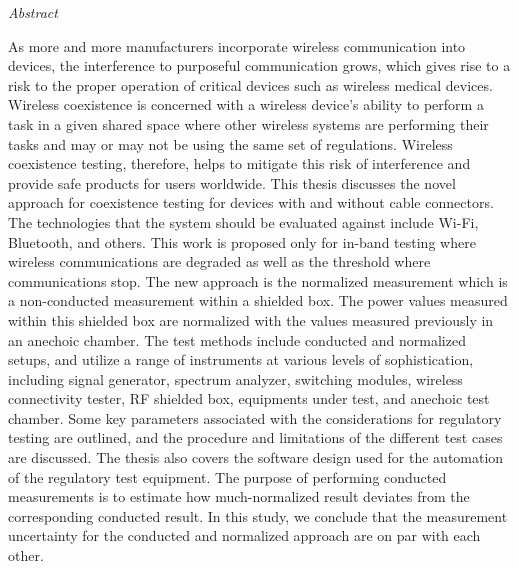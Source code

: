 

\newpage
\thispagestyle{empty}
\begin{center}
\Huge\emph{Abstract}
\end{center}
\medskip
\noindent As more and more manufacturers incorporate wireless communication into devices, the interference to purposeful communication grows, which gives rise to a risk to the proper operation of critical devices such as wireless medical devices. Wireless coexistence is concerned with a wireless device's ability to perform a task in a given shared space where other wireless systems are performing their tasks and may or may not be using the same set of regulations. Wireless coexistence testing, therefore, helps to mitigate this risk of interference and provide safe products for users worldwide. This thesis discusses the novel approach for coexistence testing for devices with and without cable connectors. The technologies that the system should be evaluated against include Wi-Fi\texttrademark{}, Bluetooth\textregistered{}, and others. This work is proposed only for in-band testing where wireless communications are degraded as well as the threshold where communications stop. The new approach is the normalized measurement which is a non-conducted measurement within a shielded box. The power values measured within this shielded box are normalized with the values measured previously in an anechoic chamber.
The test methods include conducted and normalized setups, and utilize a range of instruments at various levels of sophistication, including signal generator, spectrum analyzer, switching modules, wireless connectivity tester, RF shielded box, equipments under test, and anechoic test chamber. Some key parameters associated with the considerations for regulatory testing are outlined, and the procedure and limitations of the different test cases are discussed. The thesis also covers the software design used for the automation of the regulatory test equipment. The purpose of performing conducted measurements is to estimate how much-normalized result deviates from the corresponding conducted result. In this study, we conclude that the measurement uncertainty for the conducted and normalized approach are on par with each other. 




















